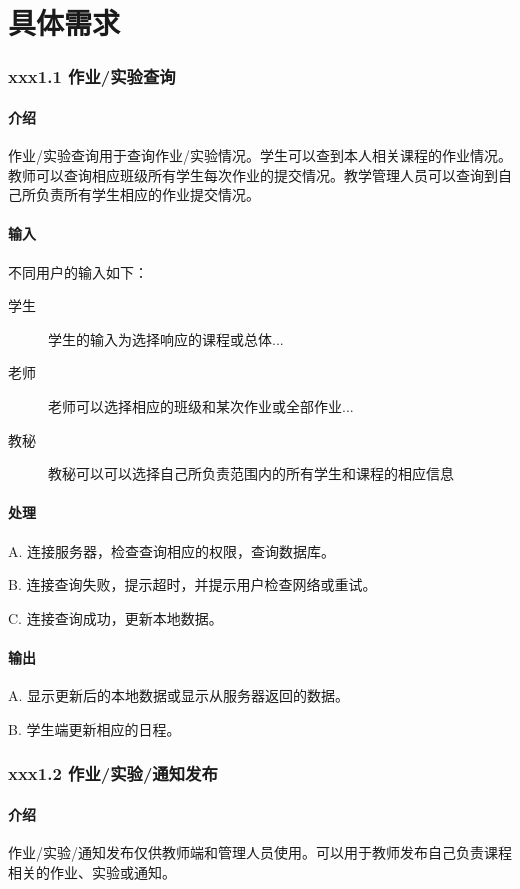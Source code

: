 \chapter{具体需求}
\subsection{xxx1.1 作业/实验查询}
  \subsubsection{介绍}
作业/实验查询用于查询作业/实验情况。学生可以查到本人相关课程的作业情况。教师可以查询相应班级所有学生每次作业的提交情况。教学管理人员可以查询到自己所负责所有学生相应的作业提交情况。
\subsubsection{输入}
   不同用户的输入如下：
   \begin{center}\begin{description}
     \item[学生] 学生的输入为选择响应的课程或总体...
     \item[老师] 老师可以选择相应的班级和某次作业或全部作业...
     \item[教秘] 教秘可以可以选择自己所负责范围内的所有学生和课程的相应信息
   \end{description}\end{center}
\subsubsection{处理}
A. 连接服务器，检查查询相应的权限，查询数据库。

B. 连接查询失败，提示超时，并提示用户检查网络或重试。

C. 连接查询成功，更新本地数据。

\subsubsection{输出}
A. 显示更新后的本地数据或显示从服务器返回的数据。

B. 学生端更新相应的日程。

\subsection{xxx1.2 作业/实验/通知发布}
  \subsubsection{介绍}
 作业/实验/通知发布仅供教师端和管理人员使用。可以用于教师发布自己负责课程相关的作业、实验或通知。
